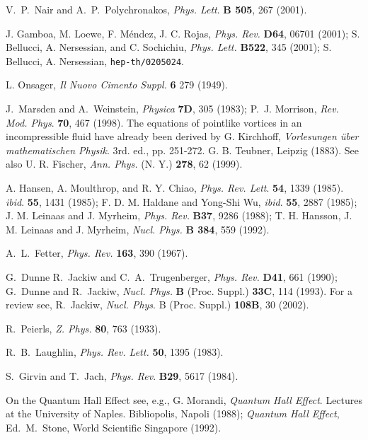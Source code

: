 \documentclass[a4paper,12pt]{article}
\begin{document}
\goodbreak
\begin{thebibliography}{0}
    
V.~P.~Nair and A.~P.~Polychronakos,
{\it  Phys. Lett}. {\bf B 505}, 267 (2001).

J. Gamboa, M. Loewe, F. M\'endez, J. C. Rojas,
{\it Phys. Rev.} {\bf D64}, 06701 (2001);
S. Bellucci, A. Nersessian, and C. Sochichiu,
{\it Phys. Lett.} {\bf B522}, 345 (2001);
S. Bellucci, A. Nersessian, \texttt{hep-th/0205024}.

L. Onsager, 
{\it Il Nuovo Cimento Suppl.} {\bf 6} 279 (1949).

J.~Marsden and A.~Weinstein,
 {\it Physica} {\bf 7D}, 305 (1983);
 P.~J. Morrison, {\it Rev. Mod. Phys}. {\bf 70}, 467 (1998).  
The equations of pointlike vortices in an incompressible
fluid have already been derived by
 G. Kirchhoff, {\it Vorlesungen \"uber mathematischen Physik}.
 $3$rd. ed., pp. 251-272. G. B. Teubner, Leipzig (1883).
 See also
 U. R. Fischer, {\it Ann. Phys.} (N. Y.) {\bf 278}, 62 (1999).

A. Hansen, A. Moulthrop, and R. Y. Chiao,
 {\it Phys. Rev. Lett}. {\bf 54}, 1339 (1985).
 {\it ibid}. {\bf 55}, 1431 (1985);
F. D. M. Haldane and Yong-Shi Wu,
{\it ibid}. {\bf 55}, 2887 (1985);
 J. M. Leinaas and J. Myrheim,
 {\it Phys. Rev.} {\bf B37},  9286 (1988);
 T. H. Hansson, J. M. Leinaas and J. Myrheim,
 {\it Nucl. Phys.} {\bf B 384},  559 (1992).
  
A.~L.~Fetter,
{\it Phys. Rev.} {\bf 163}, 390 (1967).

G.~Dunne R.~Jackiw and C.~A.~Trugenberger,
{\it Phys. Rev.} {\bf D41},  661 (1990); 
G.~Dunne and R.~Jackiw,
{\it Nucl. Phys.} {\bf B} (Proc. Suppl.) {\bf 33C}, 114 (1993).
For a review see, 
R.~Jackiw,
{\it Nucl. Phys}. {B} (Proc. Suppl.) {\bf 108B}, 30 (2002). 

R.~Peierls,
 {\it Z. Phys.} {\bf 80}, 763 (1933).

 R.~B.~Laughlin, 
 {\it Phys. Rev. Lett.} {\bf 50}, 1395 (1983).
 
S.~Girvin and T.~Jach,
{\it Phys. Rev}. {\bf B29}, 5617 (1984).

On the Quantum Hall Effect see, e.g.,
G. Morandi, {\it Quantum Hall Effect}. Lectures at the University of
Naples. Bibliopolis, Napoli (1988);
{\it Quantum Hall Effect},
Ed.~M.~Stone, World Scientific Singapore (1992).


\end{thebibliography}
\end{document}
